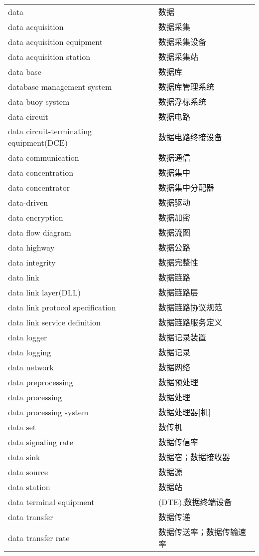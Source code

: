 \documentclass[
]{article}
\begin{document}
\begin{longtable}[]{@{}ll@{}}
data & 数据 \\
data acquisition & 数据采集 \\
data acquisition equipment & 数据采集设备 \\
data acquisition station & 数据采集站 \\
data base & 数据库 \\
database management system & 数据库管理系统 \\
data buoy system & 数据浮标系统 \\
data circuit & 数据电路 \\
data circuit-terminating equipment(DCE) & 数据电路终接设备 \\
data communication & 数据通信 \\
data concentration & 数据集中 \\
data concentrator & 数据集中分配器 \\
data-driven & 数据驱动 \\
data encryption & 数据加密 \\
data flow diagram & 数据流图 \\
data highway & 数据公路 \\
data integrity & 数据完整性 \\
data link & 数据链路 \\
data link layer(DLL) & 数据链路层 \\
data link protocol specification & 数据链路协议规范 \\
data link service definition & 数据链路服务定义 \\
data logger & 数据记录装置 \\
data logging & 数据记录 \\
data network & 数据网络 \\
data preprocessing & 数据预处理 \\
data processing & 数据处理 \\
data processing system & 数据处理器{[}机{]} \\
data set & 数传机 \\
data signaling rate & 数据传信率 \\
data sink & 数据宿；数据接收器 \\
data source & 数据源 \\
data station & 数据站 \\
data terminal equipment & (DTE),数据终端设备 \\
data transfer & 数据传递 \\
data transfer rate & 数据传送率；数据传输速率 \\

\end{longtable}
\end{document}
